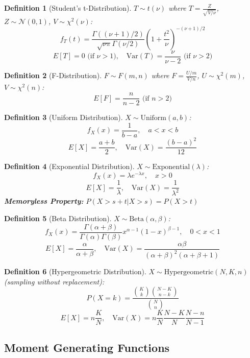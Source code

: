 \documentclass[12pt,a4paper]{amsart}
\newtheorem{definition}{Definition}[section]
\theoremstyle{remark}
\begin{document}
\begin{definition}[Student's t-Distribution]
$T \sim t(\nu)$ where $T = \frac{Z}{\sqrt{V/\nu}}$, $Z \sim \mathcal{N}(0,1)$, $V \sim \chi^2(\nu)$:
$$f_T(t) = \frac{\Gamma((\nu+1)/2)}{\sqrt{\nu\pi}\Gamma(\nu/2)} \left(1 + \frac{t^2}{\nu}\right)^{-(\nu+1)/2}$$
$$E[T] = 0 \text{ (if } \nu > 1\text{)}, \quad \text{Var}(T) = \frac{\nu}{\nu-2} \text{ (if } \nu > 2\text{)}$$
\end{definition}

\begin{definition}[F-Distribution]
$F \sim F(m,n)$ where $F = \frac{U/m}{V/n}$, $U \sim \chi^2(m)$, $V \sim \chi^2(n)$:
$$E[F] = \frac{n}{n-2} \text{ (if } n > 2\text{)}$$
\end{definition}

\begin{definition}[Uniform Distribution]
$X \sim \text{Uniform}(a,b)$:
$$f_X(x) = \frac{1}{b-a}, \quad a < x < b$$
$$E[X] = \frac{a+b}{2}, \quad \text{Var}(X) = \frac{(b-a)^2}{12}$$
\end{definition}

\begin{definition}[Exponential Distribution]
$X \sim \text{Exponential}(\lambda)$:
$$f_X(x) = \lambda e^{-\lambda x}, \quad x > 0$$
$$E[X] = \frac{1}{\lambda}, \quad \text{Var}(X) = \frac{1}{\lambda^2}$$
\textbf{Memoryless Property:} $P(X > s+t | X > s) = P(X > t)$
\end{definition}

\begin{definition}[Beta Distribution]
$X \sim \text{Beta}(\alpha, \beta)$:
$$f_X(x) = \frac{\Gamma(\alpha+\beta)}{\Gamma(\alpha)\Gamma(\beta)} x^{\alpha-1}(1-x)^{\beta-1}, \quad 0 < x < 1$$
$$E[X] = \frac{\alpha}{\alpha+\beta}, \quad \text{Var}(X) = \frac{\alpha\beta}{(\alpha+\beta)^2(\alpha+\beta+1)}$$
\end{definition}

\begin{definition}[Hypergeometric Distribution]
$X \sim \text{Hypergeometric}(N,K,n)$ (sampling without replacement):
$$P(X = k) = \frac{\binom{K}{k}\binom{N-K}{n-k}}{\binom{N}{n}}$$
$$E[X] = n\frac{K}{N}, \quad \text{Var}(X) = n\frac{K}{N}\frac{N-K}{N}\frac{N-n}{N-1}$$
\end{definition}

\subsection{Moment Generating Functions}
\end{document}
